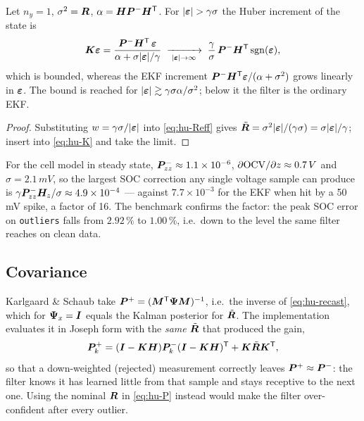 \begin{proposition}\label{prop:hu-bounded}
Let $n_y=1$, $\sigma^2=\bm{R}$, $\alpha=\bm{H}\bm{P}^{-}\bm{H}^{\mathsf{T}}$.  For $|\veps|>\gamma\sigma$ the Huber
increment of the state is
\begin{equation}
\bm{K}\bm{\varepsilon} = \frac{\bm{P}^{-}\bm{H}^{\mathsf{T}}\,\bm{\varepsilon}}{\alpha+\sigma|\bm{\varepsilon}|/\gamma}
 \;\xrightarrow[\;|\bm{\varepsilon}|\to\infty\;]{}\;
 \frac{\gamma}{\sigma}\,\bm{P}^{-}\bm{H}^{\mathsf{T}}\operatorname{sgn}(\bm{\varepsilon}),
\label{eq:hu-bound}
\end{equation}
which is bounded, whereas the EKF increment $\bm{P}^{-}\bm{H}^{\mathsf{T}}\bm{\varepsilon}/(\alpha+\sigma^2)$ grows linearly
in $\bm{\varepsilon}$.  The bound is reached for $|\bm{\varepsilon}|\gtrsim\gamma\sigma\alpha/\sigma^2$; below it the
filter is the ordinary EKF.
\end{proposition}
\begin{proof}
Substituting $w=\gamma\sigma/|\bm{\varepsilon}|$ into \eqref{eq:hu-Reff} gives
$\tilde{\bm{R}}=\sigma^2|\bm{\varepsilon}|/(\gamma\sigma)=\sigma|\bm{\varepsilon}|/\gamma$; insert into \eqref{eq:hu-K}
and take the limit.
\end{proof}
For the cell model in steady state, $\bm{P}^{-}_{zz}\approx1.1\times10^{-6}$,
$\partial\mathrm{OCV}/\partial z\approx0.7\,V$ and $\sigma=2.1\,mV$, so the
largest SOC correction any single voltage sample can produce is
$\gamma\bm{P}^{-}_{zz}\bm{H}_{z}/\sigma \approx 4.9\times10^{-4}$ --- against
$7.7\times10^{-3}$ for the EKF when hit by a 50\,mV spike, a factor of 16.  The benchmark
confirms the factor: the peak SOC error on \texttt{outliers} falls from $2.92\,\%$ to $1.00\,\%$,
i.e.\ down to the level the same filter reaches on clean data.

\subsection{Covariance}\label{sec:hu-full}
Karlgaard \& Schaub take $\bm{P}^{+}=(\bm{M}^{\mathsf{T}}\bm\Psi\bm{M})^{-1}$, i.e.\ the inverse of
\eqref{eq:hu-recast}, which for $\bm\Psi_x=\bm{I}$ equals the Kalman posterior for
$\tilde{\bm{R}}$.  The implementation evaluates it in Joseph form with the \emph{same} $\tilde{\bm{R}}$
that produced the gain,
\begin{equation}
\bm{P}^{+}_k = (\bm{I}-\bm{K}\bm{H})\bm{P}^{-}_k(\bm{I}-\bm{K}\bm{H})^{\mathsf{T}} + \bm{K}\tilde{\bm{R}}\bm{K}^{\mathsf{T}},
\label{eq:hu-P}
\end{equation}
so that a down-weighted (rejected) measurement correctly leaves $\bm{P}^{+}\approx\bm{P}^{-}$: the filter
knows it has learned little from that sample and stays receptive to the next one.  Using the
nominal $\bm{R}$ in \eqref{eq:hu-P} instead would make the filter over-confident after every outlier.

